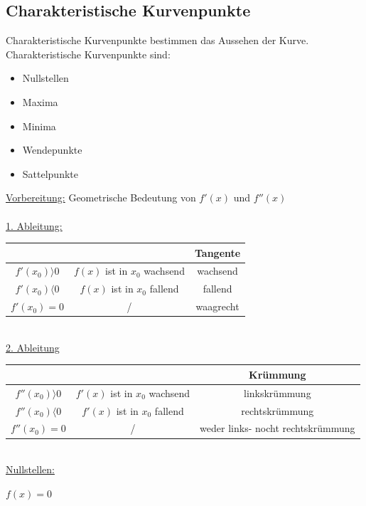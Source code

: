 \documentclass[11pt]{amsart}
\theoremstyle{remark}
\begin{document}
 \subsection{Charakteristische Kurvenpunkte}
 Charakteristische Kurvenpunkte bestimmen das Aussehen der Kurve.\\
 Charakteristische Kurvenpunkte sind:\\
 \begin{itemize}
 	\item Nullstellen
	\item Maxima
	\item Minima
	\item Wendepunkte
	\item Sattelpunkte
\end{itemize}
\underline{Vorbereitung:} Geometrische Bedeutung von $f'(x)$ und $f''(x)$\\\\
\underline{1. Ableitung:} \\
	\begin{table}[h]
		\begin{center}
			\begin{tabular}[h]{c|c|c}
				&&Tangente \\
				\hline
				$f'(x_0)\rangle 0$&$f(x)$ ist in $x_0$ wachsend & wachsend \\
				$f'(x_0) \langle 0$&$f(x)$ ist in $x_0$ fallend & fallend \\
				$f'(x_0) = 0$& / & waagrecht\\
			\end{tabular}
		\end{center}
		\label{default}
	\end{table}
	\\
\underline{2. Ableitung}\\
	\begin{table}[h]
		\begin{center}
			\begin{tabular}[h]{c|c|c}
				&&Kr\"ummung \\
				\hline
				$f''(x_0)\rangle 0$&$f'(x)$ ist in $x_0$ wachsend & linkskr\"ummung \\
				$f''(x_0) \langle 0$&$f'(x)$ ist in $x_0$ fallend & rechtskr\"ummung \\
				$f''(x_0) = 0$& / & weder links- nocht rechtskr\"ummung\\
			\end{tabular}
		\end{center}
		\label{default}
	\end{table}
\\
\underline{Nullstellen:} \\
	\begin{center}
		$f(x)=0$
	\end{center}
\end{document}
